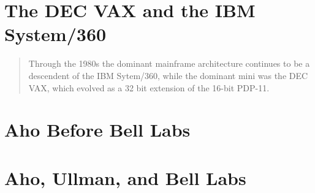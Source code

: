 \section{The DEC VAX and the IBM System/360}

\begin{quotation}
Through the 1980s the dominant mainframe architecture continues to be a 
descendent of the IBM Sytem/360, while the dominant mini was the DEC VAX, which 
evolved as a 32 bit extension of the 16-bit PDP-11.
\cite{nothing_new_since_von_neumann_2000}
\end{quotation}

\section{Aho Before Bell Labs}

\section{Aho, Ullman, and Bell Labs}


